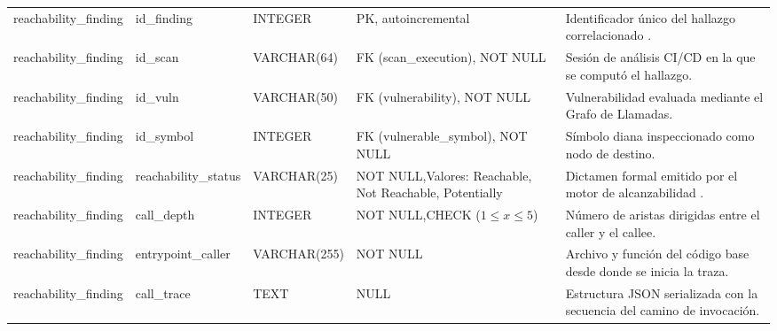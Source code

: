 \begin{table}[H]
\begin{tabularx}{\textwidth}{>{\raggedright\arraybackslash}p{2.3cm} >{\raggedright\arraybackslash}p{2.5cm} >{\raggedright\arraybackslash}p{1.9cm} >{\raggedright\arraybackslash}p{2.7cm} >{\raggedright\arraybackslash}X}
\addlinespace
reachability\_\newline finding & id\_finding & INTEGER & PK, autoincremental & Identificador único del hallazgo correlacionado \cite{torres2026proyecto}. \\
reachability\_\newline finding & id\_scan & VARCHAR\allowbreak (64) & FK (scan\_execution), NOT NULL & Sesión de análisis CI/CD en la que se computó el hallazgo. \\
reachability\_\newline finding & id\_vuln & VARCHAR\allowbreak (50) & FK (vulnerability), NOT NULL & Vulnerabilidad evaluada mediante el Grafo de Llamadas. \\
reachability\_\newline finding & id\_symbol & INTEGER & FK (vulnerable\_symbol), NOT NULL & Símbolo diana inspeccionado como nodo de destino. \\
reachability\_\newline finding & reachability\_\newline status & VARCHAR\allowbreak (25) & NOT NULL,\newline Valores: Reachable, Not Reachable, Potentially & Dictamen formal emitido por el motor de alcanzabilidad \cite{pashchenko2022vuln4real}. \\
reachability\_\newline finding & call\_depth & INTEGER & NOT NULL,\newline CHECK ($1 \le x \le 5$) & Número de aristas dirigidas entre el caller y el callee. \\
reachability\_\newline finding & entrypoint\_\newline caller & VARCHAR\allowbreak (255) & NOT NULL & Archivo y función del código base desde donde se inicia la traza. \\
reachability\_\newline finding & call\_trace & TEXT & NULL & Estructura JSON serializada con la secuencia del camino de invocación. \\
\bottomrule
\end{tabularx}
\end{table}

\newpage

